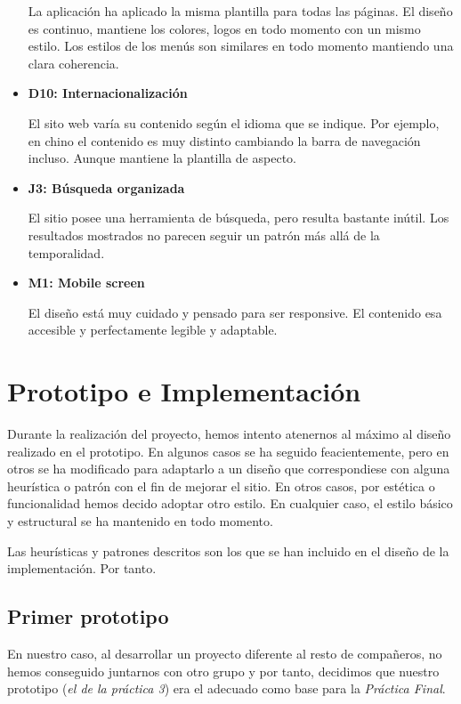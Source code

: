 \documentclass[10pt, spanish, pdftex]{template/UC3M_document}
\begin{document}
\begin{itemize}
  La aplicación ha aplicado la misma plantilla para todas las páginas. El diseño es continuo, mantiene los colores, logos en todo momento con un mismo estilo. Los estilos de los menús son similares en todo momento mantiendo una clara coherencia.

  \item \textbf{D10: Internacionalización}

  El sito web varía su contenido según el idioma que se indique. Por ejemplo, en chino el contenido es muy distinto cambiando la barra de navegación incluso. Aunque mantiene la plantilla de aspecto.

  \item \textbf{J3: Búsqueda organizada}

  El sitio posee una herramienta de búsqueda, pero resulta bastante inútil. Los resultados mostrados no parecen seguir un patrón más allá de la temporalidad.
  \item \textbf{M1: Mobile screen}

  El diseño está muy cuidado y pensado para ser responsive. El contenido esa accesible y perfectamente legible y adaptable.

\end{itemize}
\newpage

\section{Prototipo e Implementación}
Durante la realización del proyecto, hemos intento atenernos al máximo al diseño realizado en el prototipo.
En algunos casos se ha seguido feacientemente, pero en otros se ha modificado para adaptarlo a un diseño que correspondiese con alguna heurística o patrón con el fin de mejorar el sitio. En otros casos, por estética o funcionalidad hemos decido adoptar otro estilo. En cualquier caso, el estilo básico y estructural se ha mantenido en todo momento.

Las heurísticas y patrones descritos son los que se han incluido en el diseño de la implementación. Por tanto.
\subsection{Primer prototipo}
En nuestro caso, al desarrollar un proyecto diferente al resto de compañeros, no hemos conseguido juntarnos con otro grupo y por tanto, decidimos que nuestro prototipo (\textit{el de la práctica 3}) era el adecuado como base para la \textit{Práctica Final}.
\end{document}
